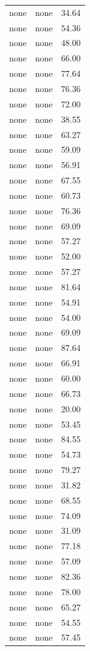 \begin{tabular}{rrr}
none & none & 34.64 \\
none & none & 54.36 \\
none & none & 48.00 \\
none & none & 66.00 \\
none & none & 77.64 \\
none & none & 76.36 \\
none & none & 72.00 \\
none & none & 38.55 \\
none & none & 63.27 \\
none & none & 59.09 \\
none & none & 56.91 \\
none & none & 67.55 \\
none & none & 60.73 \\
none & none & 76.36 \\
none & none & 69.09 \\
none & none & 57.27 \\
none & none & 52.00 \\
none & none & 57.27 \\
none & none & 81.64 \\
none & none & 54.91 \\
none & none & 54.00 \\
none & none & 69.09 \\
none & none & 87.64 \\
none & none & 66.91 \\
none & none & 60.00 \\
none & none & 66.73 \\
none & none & 20.00 \\
none & none & 53.45 \\
none & none & 84.55 \\
none & none & 54.73 \\
none & none & 79.27 \\
none & none & 31.82 \\
none & none & 68.55 \\
none & none & 74.09 \\
none & none & 31.09 \\
none & none & 77.18 \\
none & none & 57.09 \\
none & none & 82.36 \\
none & none & 78.00 \\
none & none & 65.27 \\
none & none & 54.55 \\
none & none & 57.45 \\

\end{tabular}
